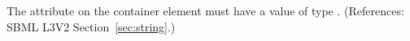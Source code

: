 The attribute  on the  container element
must have a value of type .  (References: SBML
L3V2 Section~\ref{sec:string}.)
